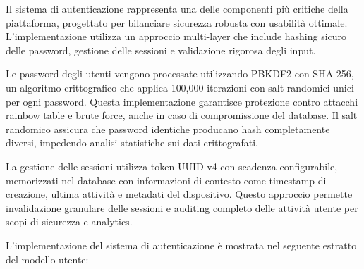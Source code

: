 \documentclass[12pt,a4paper]{article}
\begin{document}
Il sistema di autenticazione rappresenta una delle componenti più critiche della piattaforma, progettato per bilanciare sicurezza robusta con usabilità ottimale. L'implementazione utilizza un approccio multi-layer che include hashing sicuro delle password, gestione delle sessioni e validazione rigorosa degli input.

Le password degli utenti vengono processate utilizzando PBKDF2 con SHA-256, un algoritmo crittografico che applica 100,000 iterazioni con salt randomici unici per ogni password. Questa implementazione garantisce protezione contro attacchi rainbow table e brute force, anche in caso di compromissione del database. Il salt randomico assicura che password identiche producano hash completamente diversi, impedendo analisi statistiche sui dati crittografati.

La gestione delle sessioni utilizza token UUID v4 con scadenza configurabile, memorizzati nel database con informazioni di contesto come timestamp di creazione, ultima attività e metadati del dispositivo. Questo approccio permette invalidazione granulare delle sessioni e auditing completo delle attività utente per scopi di sicurezza e analytics.

L'implementazione del sistema di autenticazione è mostrata nel seguente estratto del modello utente:
\end{document}
